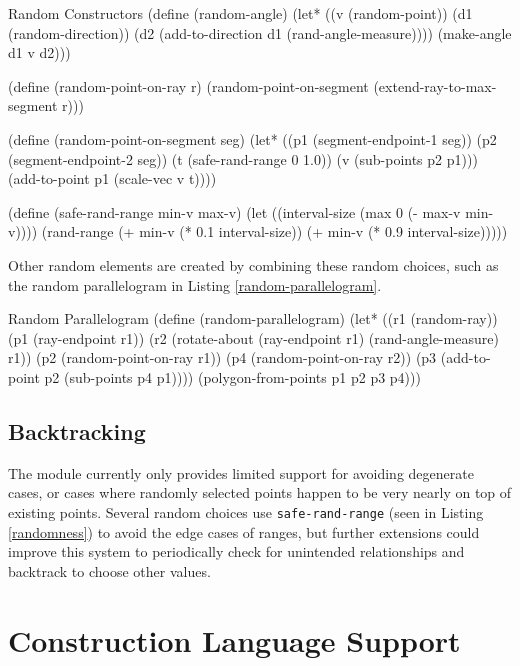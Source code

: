 \begin{code-listing}
[label=randomness]
{Random Constructors}
(define (random-angle)
  (let* ((v (random-point))
         (d1 (random-direction))
         (d2 (add-to-direction
              d1
              (rand-angle-measure))))
    (make-angle d1 v d2)))

(define (random-point-on-ray r)
  (random-point-on-segment
   (extend-ray-to-max-segment r)))

(define (random-point-on-segment seg)
  (let* ((p1 (segment-endpoint-1 seg))
         (p2 (segment-endpoint-2 seg))
         (t (safe-rand-range 0 1.0))
         (v (sub-points p2 p1)))
    (add-to-point p1 (scale-vec v t))))

(define (safe-rand-range min-v max-v)
  (let ((interval-size (max 0 (- max-v min-v))))
    (rand-range
     (+ min-v (* 0.1 interval-size))
     (+ min-v (* 0.9 interval-size)))))
\end{code-listing}

Other random elements are created by combining these random choices,
such as the random parallelogram in Listing
\ref{random-parallelogram}.

\begin{code-listing}
[label=random-parallelogram]
{Random Parallelogram}
(define (random-parallelogram)
  (let* ((r1 (random-ray))
         (p1 (ray-endpoint r1))
         (r2 (rotate-about (ray-endpoint r1)
                           (rand-angle-measure)
                           r1))
         (p2 (random-point-on-ray r1))
         (p4 (random-point-on-ray r2))
         (p3 (add-to-point
              p2
              (sub-points p4 p1))))
    (polygon-from-points p1 p2 p3 p4)))
\end{code-listing}

\subsection{Backtracking}

The module currently only provides limited support for avoiding
degenerate cases, or cases where randomly selected points happen to be
very nearly on top of existing points. Several random choices use
\texttt{safe-rand-range} (seen in Listing \ref{randomness}) to avoid
the edge cases of ranges, but further extensions could improve this
system to periodically check for unintended relationships and
backtrack to choose other values.

\section{Construction Language Support}

